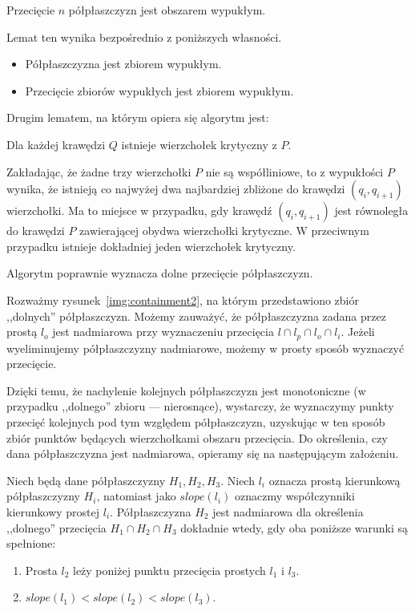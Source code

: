 \begin{lemat}\emph{\cite{Chazelle83}}
  Przecięcie $n$ półpłaszczyzn jest obszarem wypukłym.
\end{lemat}

Lemat ten wynika bezpośrednio z poniższych własności.

\begin{itemize}
  \item Półpłaszczyzna jest zbiorem wypukłym.
  \item Przecięcie zbiorów wypukłych jest zbiorem wypukłym.
\end{itemize}

Drugim lematem, na którym opiera się algorytm jest:

\begin{lemat}\emph{\cite{Chazelle83}}
  Dla każdej krawędzi $Q$ istnieje wierzchołek krytyczny z $P$.
\end{lemat}

Zakładając, że żadne trzy wierzchołki $P$ nie są współliniowe, to z
wypukłości $P$ wynika, że istnieją co najwyżej dwa najbardziej
zbliżone do krawędzi $(q_i,q_{i+1})$ wierzchołki. Ma to miejsce w
przypadku, gdy krawędź $(q_i,q_{i+1})$ jest równoległa do krawędzi $P$
zawierającej obydwa wierzchołki krytyczne. W przeciwnym przypadku
istnieje dokładniej jeden wierzchołek krytyczny.

\begin{lemat}\emph{\cite{Chazelle83}}
  Algorytm poprawnie wyznacza dolne przecięcie półpłaszczyzn.
\end{lemat}

Rozważmy rysunek~\ref{img:containment2}, na którym przedstawiono zbiór
,,dolnych'' półpłaszczyzn. Możemy zauważyć, że półpłaszczyzna zadana
przez prostą $l_o$ jest nadmiarowa przy wyznaczeniu przecięcia $l \cap
l_p \cap l_o \cap l_i$. Jeżeli wyeliminujemy półpłaszczyzny
nadmiarowe, możemy w prosty sposób wyznaczyć przecięcie.

Dzięki temu, że nachylenie kolejnych półpłaszczyzn jest monotoniczne
(w przypadku ,,dolnego'' zbioru --- nierosnące), wystarczy, że
wyznaczymy punkty przecięć kolejnych pod tym względem półpłaszczyzn,
uzyskując w ten sposób zbiór punktów będących wierzchołkami obszaru
przecięcia. Do określenia, czy dana półpłaszczyzna jest nadmiarowa,
opieramy się na następującym założeniu.

\begin{lemat}\emph{\cite{Brown78}}
  Niech będą dane półpłaszczyzny $H_1, H_2, H_3$. Niech $l_i$ oznacza
  prostą kierunkową półpłaszczyzny $H_i$, natomiast jako $slope(l_i)$
  oznaczmy współczynniki kierunkowy prostej $l_i$. Półpłaszczyzna
  $H_2$ jest nadmiarowa dla określenia ,,dolnego'' przecięcia $H_1
  \cap H_2 \cap H_3$ dokładnie wtedy, gdy oba poniższe warunki są
  spełnione:

  \begin{enumerate}
    \item Prosta $l_2$ leży poniżej punktu przecięcia prostych $l_1$ i
      $l_3$.
    \item $slope(l_1) < slope(l_2) < slope(l_3)$.
  \end{enumerate}
\end{lemat}

